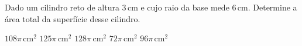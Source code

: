 Dado um cilindro reto de altura $3$\,cm e cujo raio da base mede $6$\,cm. Determine a área total da superfície desse cilindro.

$108\pi$\,cm$^2$
$125\pi$\,cm$^2$
$128\pi$\,cm$^2$
$72\pi$\,cm$^2$
$96\pi$\,cm$^2$


